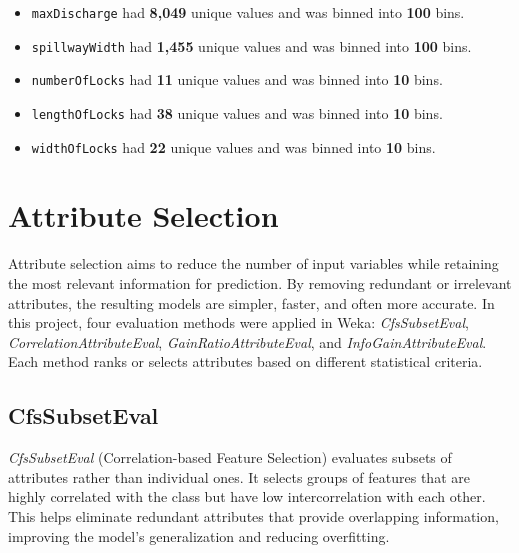 \documentclass{article}
\begin{document}
\begin{itemize}
    \item \texttt{maxDischarge} had \textbf{8,049} unique values and was binned into \textbf{100} bins.
    \item \texttt{spillwayWidth} had \textbf{1,455} unique values and was binned into \textbf{100} bins.
    \item \texttt{numberOfLocks} had \textbf{11} unique values and was binned into \textbf{10} bins.
    \item \texttt{lengthOfLocks} had \textbf{38} unique values and was binned into \textbf{10} bins.
    \item \texttt{widthOfLocks} had \textbf{22} unique values and was binned into \textbf{10} bins.
\end{itemize}



\section{Attribute Selection}

Attribute selection aims to reduce the number of input variables while retaining the most relevant information for prediction. 
By removing redundant or irrelevant attributes, the resulting models are simpler, faster, and often more accurate. 
In this project, four evaluation methods were applied in Weka: \textit{CfsSubsetEval}, \textit{CorrelationAttributeEval}, \textit{GainRatioAttributeEval}, and \textit{InfoGainAttributeEval}. 
Each method ranks or selects attributes based on different statistical criteria.

\subsection{CfsSubsetEval}
\textit{CfsSubsetEval} (Correlation-based Feature Selection) evaluates subsets of attributes rather than individual ones. 
It selects groups of features that are highly correlated with the class but have low intercorrelation with each other. 
This helps eliminate redundant attributes that provide overlapping information, improving the model’s generalization and reducing overfitting.
\end{document}
